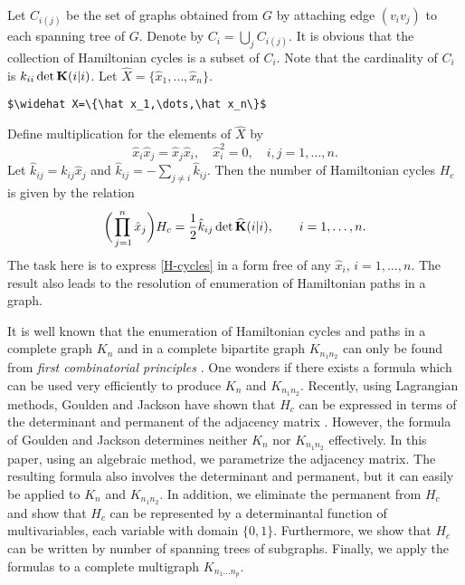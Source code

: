 Let $C_{i(j)}$ be the set of graphs obtained from $G$ by attaching edge
$(v_iv_j)$ to each spanning tree of $G$. Denote by $C_i=\bigcup_j
C_{i(j)}$. It is obvious that the collection of Hamiltonian cycles is a
subset of $C_i$. Note that the cardinality of $C_i$ is $k_{ii}\det
\bold K(i|i)$. Let $\widehat X=\{\hat x_1,\dots,\hat x_n\}$. 
%
\begin{verbatim}
$\widehat X=\{\hat x_1,\dots,\hat x_n\}$
\end{verbatim}
Define multiplication for the elements of $\widehat X$ by
\begin{equation}\label{multdef}
\hat x_i\hat x_j=\hat x_j\hat x_i,\quad \hat x^2_i=0,\quad
i,j=1,\dots,n.
\end{equation}
Let $\hat k_{ij}=k_{ij}\hat x_j$ and $\hat k_{ij}=-\sum_{j\not=i}
\hat k_{ij}$. Then the number of Hamiltonian cycles $H_c$ is given by the
relation \cite{liuchow:formalsum}
\begin{equation}\label{H-cycles}
\biggl(\prod^n_{\,j=1}\hat x_j\biggr)H_c=\frac{1}{2}\hat k_{ij}\det
\widehat{\bold K}(i|i),\qquad i=1,\dots,n.
\end{equation}
The task here is to express \eqref{H-cycles}
in a form free of any $\hat x_i$,
$i=1,\dots,n$. The result also leads to the resolution of enumeration of
Hamiltonian paths in a graph.

It is well known that the enumeration of Hamiltonian cycles and paths in a
complete graph $K_n$ and in a complete bipartite graph $K_{n_1n_2}$
can only be found from {\em first combinatorial principles\/}
\cite{hapa:graphenum}. One wonders
if there exists a formula which can be used very efficiently to produce
$K_n$ and $K_{n_1n_2}$. Recently, using Lagrangian methods, Goulden and
Jackson have shown that $H_c$ can be expressed in terms of the determinant
and permanent of the adjacency matrix \cite{gouja:lagrmeth}.
However, the formula of Goulden
and Jackson determines neither $K_n$ nor $K_{n_1n_2}$ effectively. In this
paper, using an algebraic method, we parametrize the adjacency matrix. The
resulting formula also involves the determinant and permanent, but it can
easily be applied to $K_n$ and $K_{n_1n_2}$. In addition, we eliminate the
permanent from $H_c$ and show that $H_c$ can be represented by a
determinantal function of multivariables, each variable with domain $\{0,1\}$.
Furthermore, we show that $H_c$ can be written by number of spanning trees
of subgraphs. Finally, we apply the formulas to a complete multigraph
$K_{n_1\dots n_p}$.

